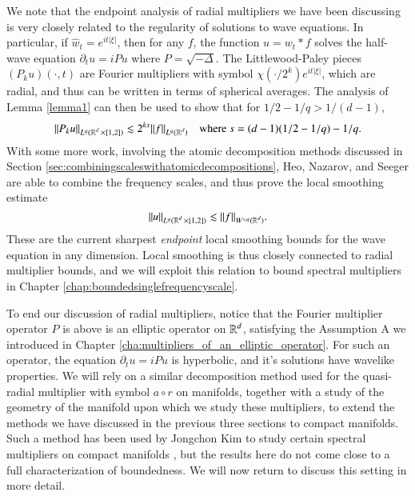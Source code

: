 We note that the endpoint analysis of radial multipliers we have been discussing is very closely related to the regularity of solutions to wave equations. In particular, if $\widehat{w}_t = e^{i t |\xi|}$, then for any $f$, the function $u = w_t * f$ solves the half-wave equation $\partial_t u = i P u$ where $P = \sqrt{-\Delta}$. The Littlewood-Paley pieces $(P_k u)(\cdot,t)$ are Fourier multipliers with symbol $\chi(\cdot / 2^k) e^{i t |\xi|}$, which are radial, and thus can be written in terms of spherical averages. The analysis of Lemma \ref{lemma1} can then be used to show that for $1/2 - 1/q > 1/(d-1)$,
%
\begin{equation}
  \| P_k u \|_{L^q( \operatorname{\mathbb{R}}^d \times [1,2] )} \lesssim 2^{k s} \| f \|_{L^q(\operatorname{\mathbb{R}}^d)}\quad\text{where}\ s = (d-1)(1/2 - 1/q) - 1/q.
\end{equation}
%
With some more work, involving the atomic decomposition methods discussed in Section \ref{sec:combiningscaleswithatomicdecompositions}, Heo, Nazarov, and Seeger are able to combine the frequency scales, and thus prove the local smoothing estimate
%
\begin{equation}
  \| u \|_{L^q(\operatorname{\mathbb{R}}^d \times [1,2])} \lesssim \| f \|_{W^{s,q}(\operatorname{\mathbb{R}}^d)}.
\end{equation}
%
These are the current sharpest \emph{endpoint} local smoothing bounds for the wave equation in any dimension. Local smoothing is thus closely connected to radial multiplier bounds, and we will exploit this relation to bound spectral multipliers in Chapter \ref{chap:boundedsinglefrequencyscale}.

To end our discussion of radial multipliers, notice that the Fourier multiplier operator $P$ is above is an elliptic operator on $\operatorname{\mathbb{R}}^d$, satisfying the Assumption A we introduced in Chapter \ref{cha:multipliers_of_an_elliptic_operator}. For such an operator, the equation $\partial_t u = i P u$ is hyperbolic, and it's solutions have wavelike properties. We will rely on a similar decomposition method used for the quasi-radial multiplier with symbol $a \circ r$ on manifolds, together with a study of the geometry of the manifold upon which we study these multipliers, to extend the methods we have discussed in the previous three sections to compact manifolds. Such a method has been used by Jongchon Kim to study certain spectral multipliers on compact manifolds \cite{KimSpectral}, but the results here do not come close to a full characterization of boundedness. We will now return to discuss this setting in more detail.








